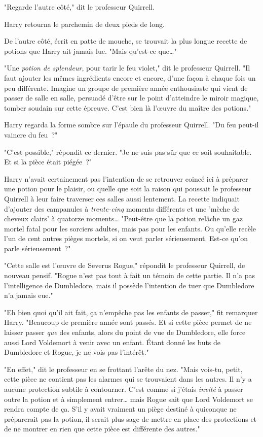 "Regarde l'autre côté," dit le professeur Quirrell.

Harry retourna le parchemin de deux pieds de long.

De l'autre côté, écrit en patte de mouche, se trouvait la plus longue recette de potions que Harry ait jamais lue. "Mais qu'est-ce que…"

"Une \emph{potion de splendeur}, pour tarir le feu violet," dit le professeur Quirrell. "Il faut ajouter les mêmes ingrédients encore et encore, d'une façon à chaque fois un peu différente. Imagine un groupe de première année enthousiaste qui vient de passer de salle en salle, persuadé d'être sur le point d'atteindre le miroir magique, tomber soudain sur cette épreuve. C'est bien là l'œuvre du maître des potions."

Harry regarda la forme sombre sur l'épaule du professeur Quirrell. "Du feu peut-il vaincre du feu~?"

"C'est possible," répondit ce dernier. "Je ne suis pas sûr que ce soit souhaitable. Et si la pièce était piégée~?"

Harry n'avait certainement pas l'intention de se retrouver coincé ici à préparer une potion pour le plaisir, ou quelle que soit la raison qui poussait le professeur Quirrell à leur faire traverser ces salles aussi lentement. La recette indiquait d'ajouter des campanules à \emph{trente-cinq} moments différents et une 'mèche de cheveux clairs' à quatorze moments… "Peut-être que la potion relâche un gaz mortel fatal pour les sorciers adultes, mais pas pour les enfants. Ou qu'elle recèle l'un de cent autres pièges mortels, si on veut parler sérieusement. Est-ce qu'on parle sérieusement~?"

"Cette salle est l'œuvre de Severus Rogue," répondit le professeur Quirrell, de nouveau pensif. "Rogue n'est pas tout à fait un témoin de cette partie. Il n'a pas l'intelligence de Dumbledore, mais il possède l'intention de tuer que Dumbledore n'a jamais eue."

"Eh bien quoi qu'il ait fait, ça n'empêche pas les enfants de passer," fit remarquer Harry. "Beaucoup de première année sont passés. Et si cette pièce permet de ne laisser passer \emph{que} des enfants, alors du point de vue de Dumbledore, elle force aussi Lord Voldemort à venir avec un enfant. Étant donné les buts de Dumbledore et Rogue, je ne vois pas l'intérêt."

"En effet," dit le professeur en se frottant l'arête du nez. "Mais vois-tu, petit, cette pièce ne contient pas les alarmes qui se trouvaient dans les autres. Il n'y a aucune protection subtile à contourner. C'est comme si j'étais \emph{invité} à passer outre la potion et à simplement entrer… mais Rogue sait que Lord Voldemort se rendra compte de ça. S'il y avait vraiment un piège destiné à quiconque ne préparerait pas la potion, il serait plus sage de mettre en place des protections et de ne montrer en rien que cette pièce est différente des autres."

